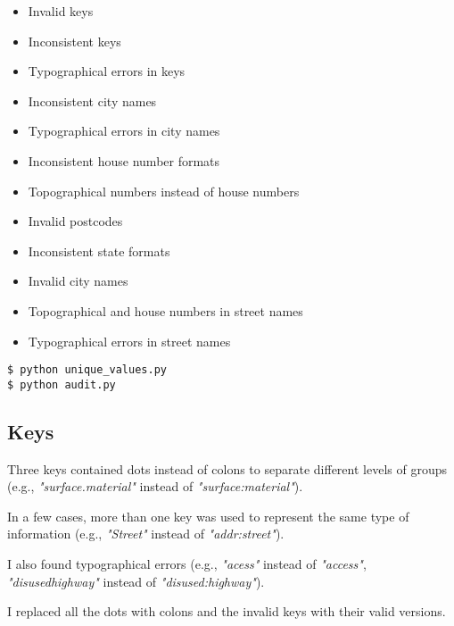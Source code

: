 \documentclass{article}
\begin{document}
\begin{multicols}{2}
\begin{itemize}[noitemsep]
\item Invalid keys
\item Inconsistent keys
\item Typographical errors in keys
\item Inconsistent city names
\item Typographical errors in city names
\item Inconsistent house number formats
\item Topographical numbers instead of house numbers
\item Invalid postcodes
\item Inconsistent state formats
\item Invalid city names
\item Topographical and house numbers in street names
\item Typographical errors in street names
\end{itemize}

\begin{lstlisting}[caption=Generate lists of unique values of the problematic fields and the keys and audit the data.,label={listing:1}]
$ python unique_values.py
$ python audit.py
\end{lstlisting}


\subsection{Keys}

Three keys contained dots instead of colons to separate different levels of groups (e.g., \textit{"surface.material"} instead of \textit{"surface:material"}).

In a few cases, more than one key was used to represent the same type of information (e.g., \textit{"Street"} instead of \textit{"addr:street"}).

I also found typographical errors (e.g., \textit{"acess"} instead of \textit{"access"}, \textit{"disusedhighway"} instead of \textit{"disused:highway"}).

I replaced all the dots with colons and the invalid keys with their valid versions.



\end{multicols}
\end{document}
